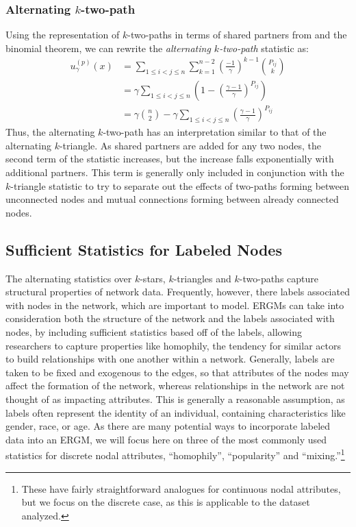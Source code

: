 \subsubsection{Alternating $k$-two-path}

Using the representation of $k$-two-paths in terms of shared partners from  and the binomial theorem, we can rewrite the \emph{alternating $k$-two-path} statistic as: 
\begin{align}
\label{eq:alternative-k-two-path}
u_\gamma^{(p)}(x) & = \sum_{1 \leq i < j \leq n} \sum_{k = 1}^{n-2} \left(\frac{-1}{\gamma}\right)^{k-1}  \binom{P_{ij}}{k} \nonumber\\
& = \gamma \sum_{1 \leq i < j \leq n}\left(1 - \left(\frac{\gamma-1}{\gamma} \right)^{P_{ij}} \right) \nonumber\\
& = \gamma \binom{n}{2} - \gamma \sum_{1 \leq i < j \leq n} \left(\frac{\gamma-1}{\gamma} \right)^{P_{ij}}
\end{align}
Thus, the alternating $k$-two-path has an interpretation similar to that of the alternating $k$-triangle. As shared partners are added for any two nodes, the second term of the statistic increases, but the increase falls exponentially with additional partners. This term is generally only included in conjunction with the $k$-triangle statistic to try to separate out the effects of two-paths forming between unconnected nodes and mutual connections forming between already connected nodes.

\subsection{Sufficient Statistics for Labeled Nodes}

The alternating statistics over $k$-stars, $k$-triangles and $k$-two-paths capture structural properties of network data. Frequently, however, there labels associated with nodes in the network, which are important to model. ERGMs can take into consideration both the structure of the network and the labels associated with nodes, by including sufficient statistics based off of the labels, allowing researchers to capture properties like homophily, the tendency for similar actors to build relationships with one another within a network. Generally, labels are taken to be fixed and exogenous to the edges, so that attributes of the nodes may affect the formation of the network, whereas relationships in the network are not thought of as impacting attributes. This is generally a reasonable assumption, as labels often represent the identity of an individual, containing characteristics like gender, race, or age. As there are many potential ways to incorporate labeled data into an ERGM, we will focus here on three of the most commonly used statistics for discrete nodal attributes, ``homophily'', ``popularity'' and ``mixing.''\footnote{These have fairly straightforward analogues for continuous nodal attributes, but we focus on the discrete case, as this is applicable to the dataset analyzed.} 

